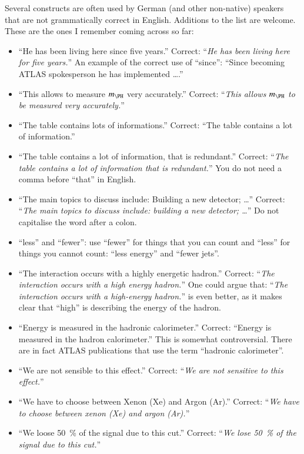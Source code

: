 Several constructs are often used by German (and other non-native) speakers
that are not grammatically correct in English.
Additions to the list are welcome.
These are the ones I remember coming across so far:
\begin{itemize}
\item \enquote{He has been living here since five years.}
  Correct: \enquote{\emph{He has been living here for five years.}}
  An example of the correct use of \enquote{since}:
  \enquote{Since becoming ATLAS spokesperson he has implemented \ldots.}
\item \enquote{This allows to measure \(m_{\PH}\) very accurately.}
  Correct: \enquote{\emph{This allows \(m_{\PH}\) to be measured very accurately.}}
\item \enquote{The table contains lots of informations.}
  Correct: \enquote{The table contains a lot of information.}
\item \enquote{The table contains a lot of information, that is redundant.}
  Correct: \enquote{\emph{The table contains a lot of information that is redundant.}}
  You do not need a comma before \enquote{that} in English.
\item \enquote{The main topics to discuss include: Building a new detector; \ldots}
  Correct: \enquote{\emph{The main topics to discuss include: building a new detector; \ldots}}
  Do not capitalise the word after a colon.
\item \enquote{less} and \enquote{fewer}: use \enquote{fewer} for things that you can count and
  \enquote{less} for things you cannot count: \enquote{less energy} and \enquote{fewer jets}.
\item \enquote{The interaction occurs with a highly energetic hadron.}
  Correct: \enquote{\emph{The interaction occurs with a high energy hadron.}}
  One could argue that: \enquote{\emph{The interaction occurs with a high-energy hadron.}}
  is even better, as it makes clear that \enquote{high} is describing the energy of the hadron.
\item \enquote{Energy is measured in the hadronic calorimeter.}
  Correct: \enquote{Energy is measured in the hadron calorimeter.}
  This is somewhat controversial.
  There are in fact ATLAS publications that use the term \enquote{hadronic calorimeter}.
\item \enquote{We are not sensible to this effect.}
  Correct: \enquote{\emph{We are not sensitive to this effect.}}
\item \enquote{We have to choose between Xenon (Xe)  and Argon (Ar).}
  Correct: \enquote{\emph{We have to choose between xenon (Xe) and argon (Ar).}}
\item \enquote{We loose \SI{50}{\%} of the signal due to this cut.}
  Correct: \enquote{\emph{We lose \SI{50}{\%} of the signal due to this cut.}}
\end{itemize}

